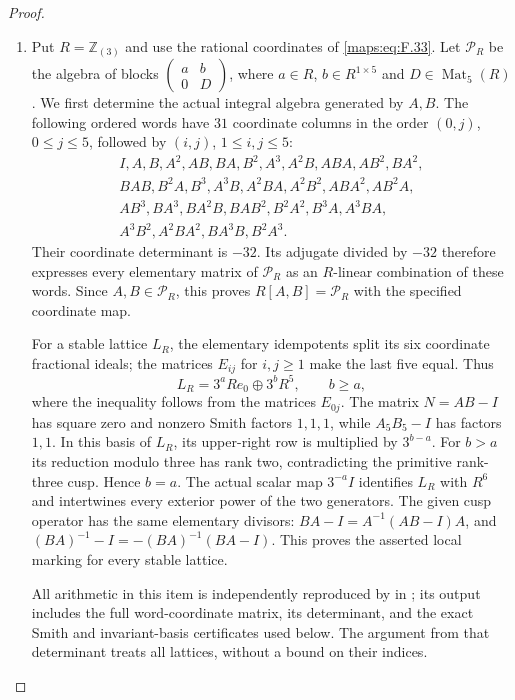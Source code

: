 \documentclass[11pt,a4paper]{article}
\theoremstyle{definition}
\begin{document}
\begin{proof}
\begin{enumerate}[label=\arabic*.]
\item Put $R=\mathbb Z_{(3)}$ and use the rational coordinates of
\eqref{maps:eq:F.33}.  Let $\mathcal P_R$ be the algebra of blocks
$\left(\begin{smallmatrix}a&b\\0&D\end{smallmatrix}\right)$,
where $a\in R$, $b\in R^{1\times5}$ and $D\in\operatorname{Mat}_5(R)$.
We first determine the actual integral algebra generated by $A,B$.
The following ordered words have $31$ coordinate columns in the order
$(0,j)$, $0\leq j\leq5$, followed by $(i,j)$,
$1\leq i,j\leq5$:
\[
\begin{gathered}
I,A,B,A^2,AB,BA,B^2,A^3,A^2B,ABA,AB^2,BA^2,\\
BAB,B^2A,B^3,A^3B,A^2BA,A^2B^2,ABA^2,AB^2A,\\
AB^3,BA^3,BA^2B,BAB^2,B^2A^2,B^3A,A^3BA,\\
A^3B^2,A^2BA^2,BA^3B,B^2A^3.
\end{gathered}
\]
Their coordinate determinant is $-32$.  Its adjugate divided by
$-32$ therefore expresses every elementary matrix of
$\mathcal P_R$ as an $R$-linear combination of these words.
Since $A,B\in\mathcal P_R$, this proves
$R[A,B]=\mathcal P_R$ with the specified coordinate map.

For a stable lattice $L_R$, the elementary idempotents split its
six coordinate fractional ideals; the matrices $E_{ij}$ for
$i,j\geq1$ make the last five equal.  Thus
\[
 L_R=3^aRe_0\oplus3^bR^5,\qquad b\geq a,
\]
where the inequality follows from the matrices $E_{0j}$.
The matrix $N=AB-I$ has square zero and nonzero Smith factors
$1,1,1$, while $A_5B_5-I$ has factors $1,1$.
In this basis of $L_R$, its upper-right row is multiplied by
$3^{b-a}$.  For $b>a$ its reduction modulo three has rank two,
contradicting the primitive rank-three cusp.  Hence $b=a$.
The actual scalar map $3^{-a}I$ identifies $L_R$ with $R^6$
and intertwines every exterior power of the two generators.
The given cusp operator has the same elementary divisors:
$BA-I=A^{-1}(AB-I)A$, and
$(BA)^{-1}-I=-(BA)^{-1}(BA-I)$.
This proves the asserted local marking for every stable lattice.

All arithmetic in this item is independently reproduced by
 in ;
its output includes the full word-coordinate matrix, its determinant,
and the exact Smith and invariant-basis certificates used below.
The argument from that determinant treats all lattices, without a
bound on their indices.


\end{enumerate}
\end{proof}
\end{document}
